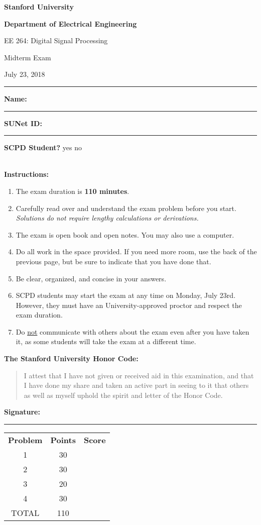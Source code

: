 \doublespacing
\begin{center}
\textbf{\Large Stanford University}

\textbf{\Large Department of Electrical Engineering}

\Large EE 264: Digital Signal Processing 

\Large Midterm Exam

\Large July 23, 2018
\end{center}
\vspace{-0.5cm}
\rule{\textwidth}{1pt}

\noindent\textbf{Name:} \rule{0.85\textwidth}{0.5pt}

\noindent\textbf{SUNet ID:} \rule{0.3\textwidth}{0.5pt}\qquad 
\textbf{SCPD Student?} yes no

\mbox{}\\
\textbf{Instructions:}
\singlespacing
\begin{enumerate}
\item The exam duration is \textbf{110 minutes}.
\item Carefully read over and understand the exam problem before you start. \textit{Solutions do not require lengthy calculations or derivations.}
\item The exam is open book and open notes. You may also use a computer.
\item Do all work in the space provided. If you need more room, use the back of the previous page, but be sure to indicate that you have done that.
\item Be clear, organized, and concise in your answers.
\item SCPD students may start the exam at any time on Monday, July 23rd. However, they must have an University-approved proctor and respect the exam duration.
\item Do \underline{not} communicate with others about the exam even after you have taken it, as some students will take the exam at a different time.
\end{enumerate}

\noindent\textbf{The Stanford University Honor Code:}
\begin{quote}
I attest that I have not given or received aid in this examination, and that I have done my share and taken an active part in seeing to it that others as well as myself uphold the spirit and letter of the Honor Code.
\end{quote}
\vspace{1mm}

\begin{center}\textbf{Signature:} \rule{0.7\textwidth}{0.5pt}\end{center}

\doublespacing
\vspace{0.1cm}
\begin{center}
\begin{tabular}{ccc}
\textbf{Problem} & \textbf{Points} & \textbf{Score} \\
1 & 30 & \\
2 & 30 & \\
3 & 20 & \\
4 & 30 & \\
TOTAL & 110 & \\
\end{tabular}
\end{center}
\singlespacing